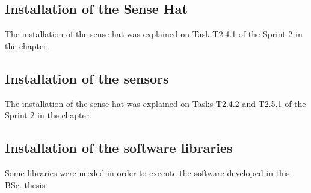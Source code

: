 \subsection{Installation of the Sense Hat}
The installation of the sense hat was explained on Task T2.4.1 of the Sprint 2 in the   chapter.

\subsection{Installation of the sensors}
The installation of the sense hat was explained on Tasks T2.4.2 and T2.5.1 of the Sprint 2 in the   chapter.


\subsection{Installation of the software libraries}
\label{chap:install-soft-lib}
Some libraries were needed in order to execute the software developed in this \ac{BSc.} thesis:
